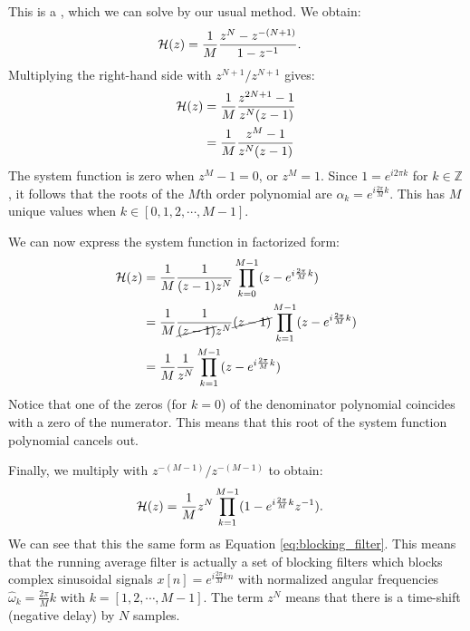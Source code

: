 \noindent This is a \emph{}, which we can solve by our usual method. We obtain:
\begin{align}
  \mathcal{H}(z) & = \frac{1}{M}\frac{z^{N} - z^{-(N+1)}}{1-z^{-1}}.
\end{align}
Multiplying the right-hand side with $z^{N+1}/z^{N+1}$ gives:
\begin{align}
  \mathcal{H}(z) & = \frac{1}{M}\frac{z^{2N+1} - 1}{z^{N}(z-1)} \\
       & = \frac{1}{M}\frac{z^{M} - 1}{z^{N}(z-1)}
\end{align}
The system function is zero when $z^{M} -1=0$, or $z^M = 1$. Since $1 =
  e^{i2\pi k}$ for $k\in\mathbb{Z}$, it follows that the roots of the
$M$th order polynomial are $\alpha_k=e^{i\frac{2\pi}{M}k}$. This has
$M$ unique values when $k\in [0,1,2,\cdots, M-1]$.

We can now express the system function in factorized form:
\begin{align}
  \mathcal{H}(z) & = \frac{1}{M} \frac{1}{(z-1)z^{N}}\prod_{k=0}^{M-1}(z-e^{i\frac{2\pi}{M}k})                        \\
       & = \frac{1}{M} \frac{1}{\cancel{(z-1)}z^{N}}\cancel{(z-1)}\prod_{k=1}^{M-1}(z-e^{i\frac{2\pi}{M}k}) \\
       & = \frac{1}{M} \frac{1}{z^{N}} \prod_{k=1}^{M-1}(z-e^{i\frac{2\pi}{M}k})
\end{align}
Notice that one of the zeros (for $k=0$) of the denominator polynomial coincides
with a zero of the numerator. This means that this root
of the system function polynomial cancels out.

Finally, we multiply with $z^{-(M-1)}/z^{-(M-1)}$ to obtain:
\begin{align}
  \mathcal{H}(z) & = \frac{1}{M} z^{N} \prod_{k=1}^{M-1}(1-e^{i\frac{2\pi}{M}k}z^{-1}).
\end{align}
We can see that this the same form as Equation
\ref{eq:blocking_filter}. This means that the running average filter
is actually a set of blocking filters which blocks complex sinusoidal
signals $x[n]=e^{i\frac{2\pi}{M}kn}$ with normalized angular frequencies
$\hat{\omega}_k=\frac{2\pi}{M}k$ with $k=[1,2,\cdots,M-1]$. The term
$z^{N}$ means that there is a time-shift (negative delay) by $N$ samples.

